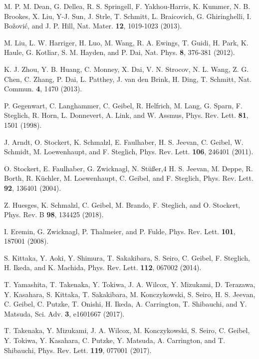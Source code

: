 \documentclass[aps,prl,onecolumn,amsmath,amssymb,superscriptaddress]{revtex4}
\begin{document}
\begin{thebibliography}{}
 M. P. M. Dean, G. Dellea, R. S. Springell, F. Yakhou-Harris, K. Kummer, N. B. Brookes, X. Liu, Y-J. Sun, J. Strle, T. Schmitt, L. Braicovich, G. Ghiringhelli, I. Bo\v{z}ovi\'{c}, and J. P. Hill, Nat. Mater. {\bf 12}, 1019-1023 (2013).

 M. Liu, L. W. Harriger, H. Luo, M. Wang, R. A. Ewings, T. Guidi, H. Park, K. Haule, G. Kotliar, S. M. Hayden, and P. Dai, Nat. Phys. {\bf 8}, 376-381 (2012).

 K. J. Zhou, Y. B. Huang, C. Monney, X. Dai, V. N. Strocov, N. L. Wang, Z. G. Chen, C. Zhang, P. Dai, L. Patthey, J. van den Brink, H. Ding, T. Schmitt, Nat. Commun. {\bf 4}, 1470 (2013).







 P. Gegenwart, C. Langhammer, C. Geibel, R. Helfrich, M. Lang, G. Sparn, F. Steglich, R. Horn, L. Donnevert, A. Link, and W. Assmus, Phys. Rev. Lett. {\bf 81}, 1501 (1998).	

 J. Arndt, O. Stockert, K. Schmalzl, E. Faulhaber, H. S. Jeevan, C. Geibel, W. Schmidt, M. Loewenhaupt, and F. Steglich, Phys. Rev. Lett. {\bf 106}, 246401 (2011).


 O. Stockert, E. Faulhaber, G. Zwicknagl, N. St\"{u}{\ss}er,4 H. S. Jeevan, M. Deppe, R. Borth, R. K\"{u}chler, M. Loewenhaupt, C. Geibel, and F. Steglich, Phys. Rev. Lett. {\bf 92}, 136401 (2004).

 Z. Huesges, K. Schmalzl, C. Geibel, M. Brando, F. Steglich, and O. Stockert, Phys. Rev. B {\bf 98}, 134425 (2018).




 I. Eremin, G. Zwicknagl, P. Thalmeier, and P. Fulde, Phys. Rev. Lett. {\bf 101}, 187001 (2008).

 S. Kittaka, Y. Aoki, Y. Shimura, T. Sakakibara, S. Seiro, C. Geibel, F. Steglich, H. Ikeda, and K. Machida, Phys. Rev. Lett. {\bf 112}, 067002 (2014).

 T. Yamashita, T. Takenaka, Y. Tokiwa, J. A. Wilcox, Y. Mizukami, D. Terazawa, Y. Kasahara, S. Kittaka, T. Sakakibara, M. Konczykowski, S. Seiro, H. S. Jeevan, C. Geibel, C. Putzke, T. Onishi, H. Ikeda, A. Carrington, T. Shibauchi, and Y. Matsuda, Sci. Adv. {\bf 3}, e1601667 (2017).

 T. Takenaka, Y. Mizukami, J. A. Wilcox, M. Konczykowski, S. Seiro, C. Geibel, Y. Tokiwa, Y. Kasahara, C. Putzke, Y. Matsuda, A. Carrington, and T. Shibauchi, Phys. Rev. Lett. {\bf 119}, 077001 (2017).


\end{thebibliography}
\end{document}
